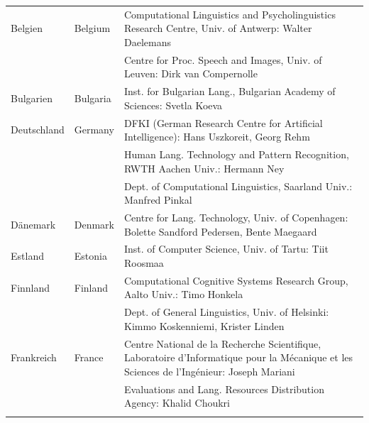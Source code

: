 \documentclass[]{../../metanetpaper}
\begin{document}
\cleardoublepage

\appendix
{}



  
\cleardoublepage

\label{metanetmembers}

\small
\begin{longtable}{llp{105mm}}
  Belgien & \textcolor{grey1}{Belgium} & Computational Linguistics and Psycholinguistics Research Centre, Univ. of Antwerp: Walter Daelemans\\ \addlinespace
  & & Centre for Proc. Speech and Images, Univ. of Leuven: Dirk van Compernolle \\ \addlinespace
  Bulgarien & \textcolor{grey1}{Bulgaria} & Inst. for Bulgarian Lang., Bulgarian Academy of Sciences: Svetla Koeva \\ \addlinespace
  Deutschland & \textcolor{grey1}{Germany} & DFKI (German Research Centre for Artificial Intelligence): Hans Uszkoreit, Georg Rehm\\ \addlinespace
  & & Human Lang. Technology and Pattern Recognition, RWTH Aachen Univ.: Hermann Ney \\ \addlinespace
  & & Dept. of Computational Linguistics, Saarland Univ.: Manfred Pinkal\\ \addlinespace Dänemark &  \textcolor{grey1}{Denmark} & Centre for Lang. Technology, Univ. of Copenhagen: Bolette Sandford Pedersen, Bente Maegaard\\ \addlinespace
  Estland & \textcolor{grey1}{Estonia} & Inst. of Computer Science, Univ. of Tartu: Tiit Roosmaa\\ \addlinespace
  Finnland & \textcolor{grey1}{Finland} & Computational Cognitive Systems Research Group, Aalto Univ.: Timo Honkela\\ \addlinespace
  & & Dept. of General Linguistics, Univ. of Helsinki: Kimmo Koskenniemi, Krister Linden \\ \addlinespace
  Frankreich & \textcolor{grey1}{France} & Centre National de la Recherche Scientifique, Laboratoire d'Informatique pour la Mécanique et les Sciences de l'Ingénieur: Joseph Mariani \\ \addlinespace
  & & Evaluations and Lang. Resources Distribution Agency: Khalid Choukri\\ \addlinespace 

\end{longtable}
\end{document}
